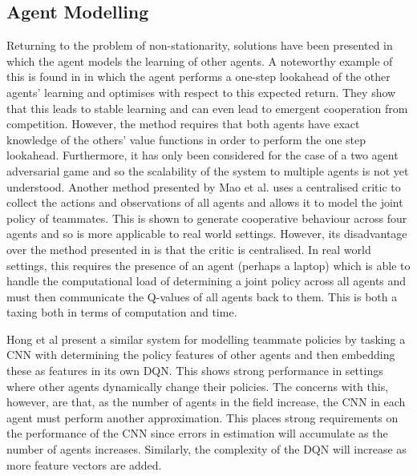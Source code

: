 \documentclass[../sample.tex]{subfiles}
\begin{document}


\subsection*{Agent Modelling}

Returning to the problem of non-stationarity, solutions have been presented in which the agent
models the learning of other agents. A noteworthy example of this is found in
\cite{Foerster2018LearningAwareness} in which the agent performs a one-step lookahead of the other
agents' learning and optimises with respect to this expected return. They show that this leads to
stable learning and can even lead to emergent cooperation from competition. However, the method
requires that both agents have exact knowledge of the others' value functions in order to perform
the one step lookahead. Furthermore, it has only been considered for the case of a two agent
adversarial game and so the scalability of the system to multiple agents is not yet understood.
Another method presented by Mao et al. \cite{MaoModellingDDPG} uses a centralised critic to collect
the actions and observations of all agents and allows it to model the joint policy of teammates.
This is shown to generate cooperative behaviour across four agents and so is more applicable to real
world settings. However, its disadvantage over the method presented in
\cite{Foerster2018LearningAwareness} is that the critic is centralised. In real world settings, this
requires the presence of an agent (perhaps a laptop) which is able to handle the computational load
of determining a joint policy across all agents and must then communicate the Q-values of all agents
back to them. This is both a taxing both in terms of computation and time. 

Hong et al \cite{Hong2018ASystems} present a similar system for modelling teammate policies by
tasking a CNN with determining the policy features of other agents and then embedding these as
features in its own DQN. This shows strong performance in settings where other agents dynamically
change their policies. The concerns with this, however, are that, as the number of agents in the
field increase, the CNN in each agent must perform another approximation. This places strong
requirements on the performance of the CNN since errors in estimation will accumulate as the number
of agents increases. Similarly, the complexity of the DQN will increase as more feature vectors are
added. 
\end{document}
